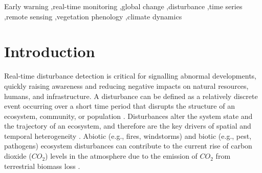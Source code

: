 \documentclass[authoryear,preprint,review,10pt]{elsarticle}
\begin{document}
\begin{frontmatter}
\begin{keyword}
Early warning \sep real-time monitoring \sep global change \sep disturbance \sep time series \sep remote sensing \sep vegetation phenology \sep climate dynamics
\end{keyword}

\end{frontmatter}



\section{Introduction}


Real-time disturbance detection is critical for signalling abnormal developments, quickly raising awareness and reducing negative impacts on natural resources, humans, and infrastructure. A disturbance can be defined as a relatively discrete event occurring over a short time period that disrupts the structure of an ecosystem, community, or population \citep{Pickett:1986td}. Disturbances alter the system state and the trajectory of an ecosystem, and therefore are the key drivers of spatial and temporal heterogeneity \citep{Turner:2010wo}. Abiotic (e.g., fires, windstorms) and biotic (e.g., pest, pathogens) ecosystem disturbances can contribute to the current rise of carbon dioxide ($CO_2$) levels in the atmosphere due to the emission of $CO_2$ from terrestrial biomass loss \citep{Potter2003,Schimel:2001vi}. 


\end{document}
